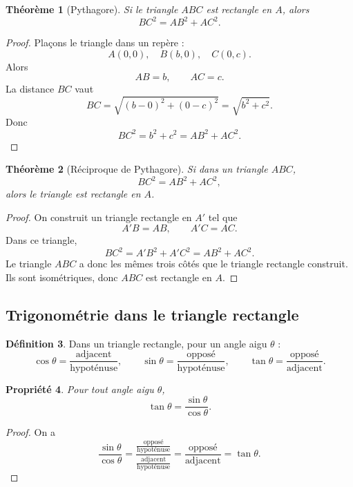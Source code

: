 \documentclass[11pt,a4paper]{article}
\theoremstyle{definition}
\newtheorem{definition}{Définition}[section]
\theoremstyle{plain}
\newtheorem{propriete}[definition]{Propriété}
\newtheorem{theoreme}[definition]{Théorème}
\begin{document}
\begin{theoreme}[Pythagore]
Si le triangle $ABC$ est rectangle en $A$, alors
\[
BC^2=AB^2+AC^2.
\]
\end{theoreme}

\begin{proof}
Plaçons le triangle dans un repère :
\[
A(0,0),\quad B(b,0),\quad C(0,c).
\]
Alors
\[
AB=b,\qquad AC=c.
\]
La distance $BC$ vaut
\[
BC=\sqrt{(b-0)^2+(0-c)^2}=\sqrt{b^2+c^2}.
\]
Donc
\[
BC^2=b^2+c^2=AB^2+AC^2.
\]
\end{proof}

\begin{theoreme}[Réciproque de Pythagore]
Si dans un triangle $ABC$,
\[
BC^2=AB^2+AC^2,
\]
alors le triangle est rectangle en $A$.
\end{theoreme}

\begin{proof}
On construit un triangle rectangle en $A'$ tel que
\[
A'B=AB,\qquad A'C=AC.
\]
Dans ce triangle,
\[
BC^2=A'B^2+A'C^2=AB^2+AC^2.
\]
Le triangle $ABC$ a donc les mêmes trois côtés que le triangle rectangle construit.
Ils sont isométriques, donc $ABC$ est rectangle en $A$.
\end{proof}

\subsection{Trigonométrie dans le triangle rectangle}

\begin{definition}
Dans un triangle rectangle, pour un angle aigu $\theta$ :
\[
\cos\theta=\frac{\text{adjacent}}{\text{hypoténuse}},\qquad
\sin\theta=\frac{\text{opposé}}{\text{hypoténuse}},\qquad
\tan\theta=\frac{\text{opposé}}{\text{adjacent}}.
\]
\end{definition}

\begin{propriete}
Pour tout angle aigu $\theta$,
\[
\tan\theta=\frac{\sin\theta}{\cos\theta}.
\]
\end{propriete}

\begin{proof}
On a
\[
\frac{\sin\theta}{\cos\theta}
=
\frac{\frac{\text{opposé}}{\text{hypoténuse}}}{\frac{\text{adjacent}}{\text{hypoténuse}}}
=
\frac{\text{opposé}}{\text{adjacent}}
=
\tan\theta.
\]
\end{proof}

\newpage

\end{document}
